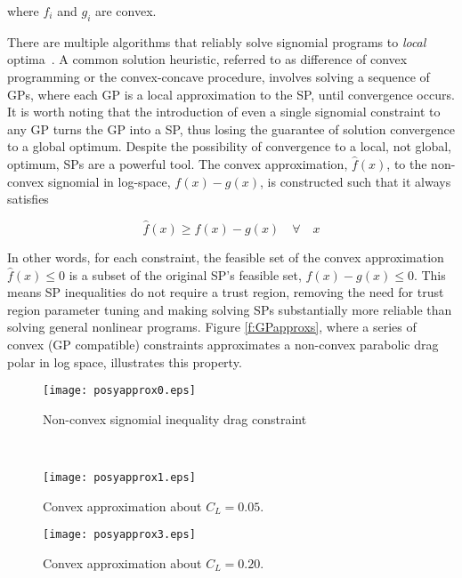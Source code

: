 where $f_{i}$ and $g_{i}$ are convex.

There are multiple algorithms that reliably solve signomial programs to
\textit{local} optima~\cite{gpintro, spsolutions}. A common solution heuristic,
referred to as difference of convex programming or the convex-concave procedure,
involves solving a sequence of GPs, where each GP is a local approximation to
the SP, until convergence occurs. It is worth noting that the introduction of
even a single signomial constraint to any GP turns the GP into a \gls{SP}, thus losing
the guarantee of solution convergence to a global optimum. Despite the
possibility of convergence to a local, not global, optimum, SPs are a powerful
tool. The convex approximation, $\hat{f}(x)$, to the non-convex signomial in
log-space, $f(x) - g(x)$, is constructed such that it always satisfies

\begin{equation}
\hat{f}(x) \geq f(x) - g(x) \quad \forall \quad x
\end{equation}

In other words, for each constraint, the feasible set of the convex
approximation $\hat{f}(x) \leq 0$ is a subset of the original SP's feasible set,
$f(x) - g(x) \leq 0$. This means SP inequalities do not require a trust region,
removing the need for trust region parameter tuning and making solving SPs
substantially more reliable than solving general nonlinear programs. Figure
\ref{f:GPapproxs}, where a series of convex (GP compatible) constraints
approximates a non-convex parabolic drag polar in log space, illustrates this
property.

\begin{figure*}[t!]
    \centering
    \begin{subfigure}[t]{0.5\linewidth}
        \centering
        \texttt{[image: posyapprox0.eps]}
        \caption{Non-convex signomial inequality drag constraint}
    \end{subfigure}%
    ~
    \begin{subfigure}[t]{0.5\linewidth}
        \centering
        \texttt{[image: posyapprox1.eps]}
        \caption{Convex approximation about $C_{L} = 0.05$.}
    \end{subfigure}
    \begin{subfigure}[b]{0.5\linewidth}
        \centering
        \texttt{[image: posyapprox3.eps]}
        \caption{Convex approximation about $C_{L} = 0.20.$}
    \end{subfigure}
    \caption{A signomial inequality constraint and GP approximations about two
different points.}
    \label{f:GPapproxs}
\end{figure*}

